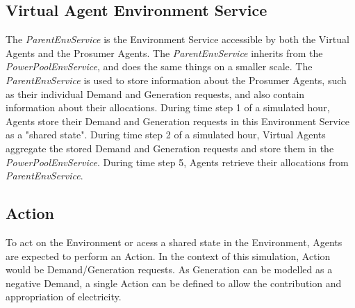 \subsection*{Virtual Agent Environment Service}
The \textit{ParentEnvService} is the Environment Service accessible by both the Virtual Agents and the Prosumer Agents. The \textit{ParentEnvService} inherits from the \textit{PowerPoolEnvService}, and does the same things on a smaller scale. The \textit{ParentEnvService} is used to store information about the Prosumer Agents, such as their individual Demand and Generation requests, and also contain information about their allocations. During time step 1 of a simulated hour, Agents store their Demand and Generation requests in this Environment Service as a "shared state". During time step 2 of a simulated hour, Virtual Agents aggregate the stored Demand and Generation requests and store them in the \textit{PowerPoolEnvService}. During time step 5, Agents retrieve their allocations from \textit{ParentEnvService}.

\subsection*{Action}
To act on the Environment or acess a shared state in the Environment, Agents are expected to perform an Action. In the context of this simulation, Action would be Demand/Generation requests. As Generation can be modelled as a negative Demand, a single Action can be defined to allow the contribution and appropriation of electricity. 

